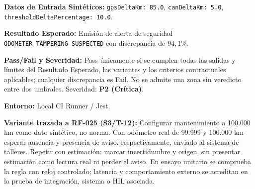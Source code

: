 \par\noindent\textbf{Datos de Entrada Sintéticos:} \texttt{g\allowbreak{}p\allowbreak{}s\allowbreak{}D\allowbreak{}e\allowbreak{}l\allowbreak{}t\allowbreak{}a\allowbreak{}K\allowbreak{}m\allowbreak{}:\allowbreak{} 8\allowbreak{}5\allowbreak{}.\allowbreak{}0\allowbreak{}}, \texttt{c\allowbreak{}a\allowbreak{}n\allowbreak{}D\allowbreak{}e\allowbreak{}l\allowbreak{}t\allowbreak{}a\allowbreak{}K\allowbreak{}m\allowbreak{}:\allowbreak{} 5\allowbreak{}.\allowbreak{}0\allowbreak{}}, \texttt{t\allowbreak{}h\allowbreak{}r\allowbreak{}e\allowbreak{}s\allowbreak{}h\allowbreak{}o\allowbreak{}l\allowbreak{}d\allowbreak{}D\allowbreak{}e\allowbreak{}l\allowbreak{}t\allowbreak{}a\allowbreak{}P\allowbreak{}e\allowbreak{}r\allowbreak{}c\allowbreak{}e\allowbreak{}n\allowbreak{}t\allowbreak{}a\allowbreak{}g\allowbreak{}e\allowbreak{}:\allowbreak{} 1\allowbreak{}0\allowbreak{}.\allowbreak{}0\allowbreak{}}.\par
\par\noindent\textbf{Resultado Esperado:} Emisión de alerta de seguridad \texttt{O\allowbreak{}D\allowbreak{}O\allowbreak{}M\allowbreak{}E\allowbreak{}T\allowbreak{}E\allowbreak{}R\allowbreak{}\_\allowbreak{}T\allowbreak{}A\allowbreak{}M\allowbreak{}P\allowbreak{}E\allowbreak{}R\allowbreak{}I\allowbreak{}N\allowbreak{}G\allowbreak{}\_\allowbreak{}S\allowbreak{}U\allowbreak{}S\allowbreak{}P\allowbreak{}E\allowbreak{}C\allowbreak{}T\allowbreak{}E\allowbreak{}D\allowbreak{}} con discrepancia de \(94{,}1\%\).\par
\par\noindent\textbf{Pass/Fail y Severidad:} Pass únicamente si se cumplen todas las salidas y límites del Resultado Esperado, las variantes y los criterios contractuales aplicables; cualquier discrepancia es Fail. No se admite una zona sin veredicto entre dos umbrales. Severidad: \textbf{P2 (Crítica)}.\par
\par\noindent\textbf{Entorno:} Local CI Runner / Jest.\par







\par\noindent\textbf{Variante trazada a RF-025 (S3/T-12):} Configurar mantenimiento a 100.000 km como dato sintético, no norma. Con odómetro real de 99.999 y 100.000 km esperar ausencia y presencia de aviso, respectivamente, enviado al sistema de talleres. Repetir con estimación: marcar incertidumbre y origen, sin presentar estimación como lectura real ni perder el aviso. En ensayo unitario se comprueba la regla con reloj controlado; latencia y comportamiento externo se acreditan en la prueba de integración, sistema o HIL asociada.\par
